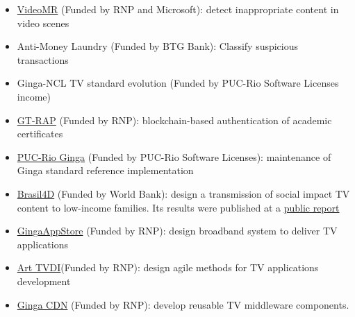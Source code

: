 \documentclass[10pt,a4paper,sans,colorlinks]{moderncv}
\begin{document}
  \begin{itemize}[mynosep]
    \item \href{https://www.rnp.br/en/rnp-and-microsoft-challenge-artificial-intelligence}{VideoMR} (Funded by RNP and Microsoft): detect inappropriate content in video scenes
    \item Anti-Money Laundry (Funded by BTG Bank): Classify suspicious transactions
    \item Ginga-NCL TV standard evolution (Funded by PUC-Rio Software Licenses income)
    \item \href{http://wrnp.rnp.br/sites/wrnp2017/files/02_wrnp2017_poster_gt-sap_design.pdf}{GT-RAP} (Funded by RNP): blockchain-based authentication of academic certificates
  \end{itemize}
  
  \begin{itemize}[mynosep]
    \item\href{{https://github.com/TeleMidia/ginga}}{PUC-Rio Ginga} (Funded by PUC-Rio Software Licenses): maintenance of Ginga \newline standard reference implementation
  \end{itemize}
  
  \begin{itemize}[mynosep]
    \item \href{http://www.ebc.com.br/brasil-4d}{Brasil4D} (Funded by World Bank): design a transmission of social impact TV content to low-income families. Its results were published at a \href{http://documents.worldbank.org/curated/en/232621468230956108/pdf/809560WP0PORTU0Box0379824B00PUBLIC0.pdf}{public report}
  \end{itemize}

  \begin{itemize}[mynosep]
    \item \href{http://www.redetic.rnp.br/ctic/2019/01/29/ginga-appstore/}{GingaAppStore}  (Funded by RNP): design broadband system to deliver TV applications
    \item \href{http://www.redetic.rnp.br/ctic/2019/01/29/arttvdi/}{Art TVDI}(Funded by RNP): design agile methods for TV applications development
    \item \href{http://www.redetic.rnp.br/ctic/2019/01/29/gingarap-gingafrevo/}{Ginga CDN} (Funded by RNP): develop reusable TV middleware components.
  \end{itemize}
\end{document}
